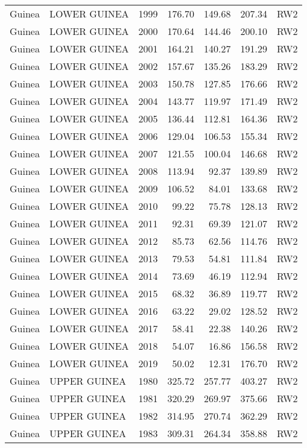 \begin{longtable}{lllrrrl}
  Guinea & LOWER GUINEA & 1999 & 176.70 & 149.68 & 207.34 & RW2 \\ 
  Guinea & LOWER GUINEA & 2000 & 170.64 & 144.46 & 200.10 & RW2 \\ 
  Guinea & LOWER GUINEA & 2001 & 164.21 & 140.27 & 191.29 & RW2 \\ 
  Guinea & LOWER GUINEA & 2002 & 157.67 & 135.26 & 183.29 & RW2 \\ 
  Guinea & LOWER GUINEA & 2003 & 150.78 & 127.85 & 176.66 & RW2 \\ 
  Guinea & LOWER GUINEA & 2004 & 143.77 & 119.97 & 171.49 & RW2 \\ 
  Guinea & LOWER GUINEA & 2005 & 136.44 & 112.81 & 164.36 & RW2 \\ 
  Guinea & LOWER GUINEA & 2006 & 129.04 & 106.53 & 155.34 & RW2 \\ 
  Guinea & LOWER GUINEA & 2007 & 121.55 & 100.04 & 146.68 & RW2 \\ 
  Guinea & LOWER GUINEA & 2008 & 113.94 & 92.37 & 139.89 & RW2 \\ 
  Guinea & LOWER GUINEA & 2009 & 106.52 & 84.01 & 133.68 & RW2 \\ 
  Guinea & LOWER GUINEA & 2010 & 99.22 & 75.78 & 128.13 & RW2 \\ 
  Guinea & LOWER GUINEA & 2011 & 92.31 & 69.39 & 121.07 & RW2 \\ 
  Guinea & LOWER GUINEA & 2012 & 85.73 & 62.56 & 114.76 & RW2 \\ 
  Guinea & LOWER GUINEA & 2013 & 79.53 & 54.81 & 111.84 & RW2 \\ 
  Guinea & LOWER GUINEA & 2014 & 73.69 & 46.19 & 112.94 & RW2 \\ 
  Guinea & LOWER GUINEA & 2015 & 68.32 & 36.89 & 119.77 & RW2 \\ 
  Guinea & LOWER GUINEA & 2016 & 63.22 & 29.02 & 128.52 & RW2 \\ 
  Guinea & LOWER GUINEA & 2017 & 58.41 & 22.38 & 140.26 & RW2 \\ 
  Guinea & LOWER GUINEA & 2018 & 54.07 & 16.86 & 156.58 & RW2 \\ 
  Guinea & LOWER GUINEA & 2019 & 50.02 & 12.31 & 176.70 & RW2 \\ 
  Guinea & UPPER GUINEA & 1980 & 325.72 & 257.77 & 403.27 & RW2 \\ 
  Guinea & UPPER GUINEA & 1981 & 320.29 & 269.97 & 375.66 & RW2 \\ 
  Guinea & UPPER GUINEA & 1982 & 314.95 & 270.74 & 362.29 & RW2 \\ 
  Guinea & UPPER GUINEA & 1983 & 309.31 & 264.34 & 358.88 & RW2 \\ 

\end{longtable}

